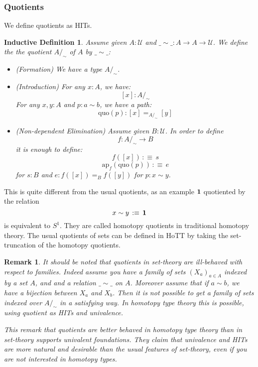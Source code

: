 \documentclass{article}
\newcommand{\ssse}[1]{\subsubsection*{#1}}
\newcommand{\U}{{\mathcal U}}
\renewcommand{\r}{\rightarrow}
\newcommand{\ap}{\mathrm{ap}}
\newcommand{\one}{{\bf 1}}
\newtheorem{remark}{Remark}
\newtheorem{ind_def}{Inductive Definition}
\begin{document}
\ssse{Quotients}

We define quotients as HITs. 

\begin{ind_def}
Assume given $A:\U$ and $\_\sim\_:A\r A\r \U$. We define the the quotient $A/_\sim$ of $A$ by $\_\sim\_$:
\begin{itemize}
\item (Formation) We have a type $A/_\sim$.
\item (Introduction) For any $x:A$, we have:
\[[x] : A/_\sim\] 
For any $x,y:A$ and $p:a\sim b$, we have a path:
\[\mathrm{quo}(p) : [x] =_{A/_\sim} [y]\]
\item (Non-dependent Elimination) Assume given $B : \U$. In order to define 
\[f:A/_\sim\r B\]
 it is enough to define:
\[f([x]) \, :\equiv \, s \]
\[\ap_f(\mathrm{quo}(p)) \, :\equiv\, e\]
for $s:B$ and $e:f([x])=_{B}f([y])$ for $p:x\sim y$.
\end{itemize}
\end{ind_def}

This is quite different from the usual quotients, as an example $\one$ quotiented by the relation 
\[x\sim y \, :\equiv\, \one\]
is equivalent to $S^1$. They are called homotopy quotients in traditional homotopy theory. The usual quotients of sets can be defined in HoTT by taking the set-truncation of the homotopy quotients. 

\begin{remark}
It should be noted that quotients in set-theory are ill-behaved with respect to families. Indeed assume you have a family of sets $(X_a)_{a\in A}$ indexed by a set $A$, and and a relation $\_\sim\_$ on $A$.%
Moreover assume that if $a\sim b$, we have a bijection between $X_a$ and $X_b$. Then it is not possible to get a family of sets indexed over $A/_\sim$ in a satisfying way. In homotopy type theory this is possible, using quotient as HITs and univalence.


This remark that quotients are better behaved in homotopy type theory than in set-theory supports \emph{univalent foundations}. They claim that univalence and HITs are more natural and desirable than the usual features of set-theory, even if you are not interested in homotopy types. %
 \end{remark}
\end{document}
